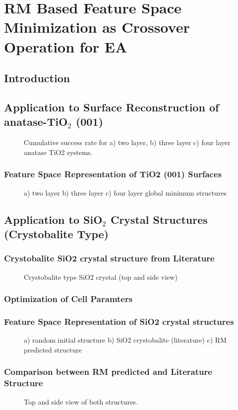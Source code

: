 \chapter{RM Based Feature Space Minimization as Crossover Operation for EA}
\section{Introduction}
\section{Application to  Surface Reconstruction of anatase-TiO$_2$ (001)}
\begin{figure}
  \label{fig:resultsforTiO2}
\caption{Cumulative success rate for a) two layer, b) three layer c) four layer anatase TiO2 systems.}
\end{figure}
\subsection{Feature Space Representation of TiO2 (001)  Surfaces}
\begin{figure}
  \label{fig:featureTiO2}
\caption{ a) two layer b) three layer c) four layer global minimum structures}
\end{figure}
\section{Application to SiO$_2$ Crystal Structures (Crystobalite Type)}
\subsection{Crystobalite  SiO2 crystal structure from Literature}
\begin{figure}
  \label{fig:myfig}
\caption{Crystobalite type SiO2 crystal (top  and side view)}
\end{figure}
\subsection{Optimization of Cell Paramters}

\subsection{Feature Space Representation of SiO2 crystal structures}
\begin{figure}
  \label{fig:myfig}
\caption{ a) random initial structure b) SiO2 crystobalite (literature) c) RM predicted structure}
\end{figure}
\subsection{Comparison between RM predicted and Literature Structure }
\begin{figure}
  \label{fig:myfig}
\caption{Top and side view of both structures.}
\end{figure}
